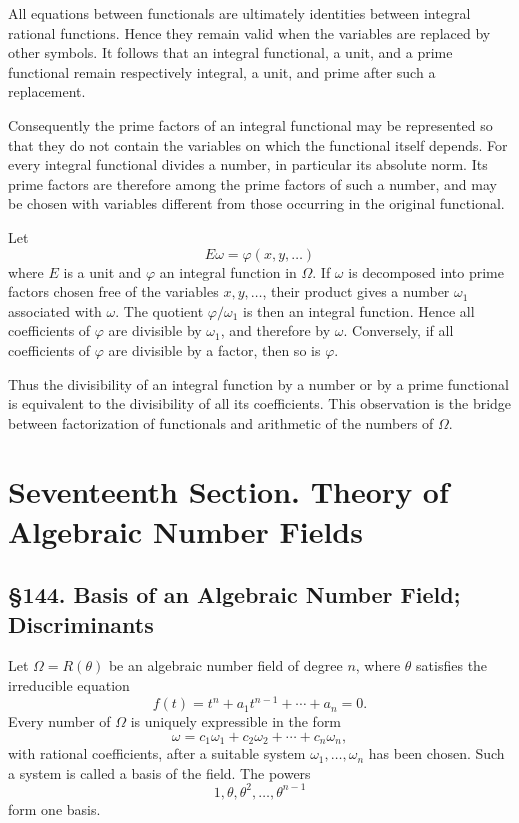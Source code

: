 \documentclass[11pt,a4paper]{book}
\newcommand{\webersection}[2]{\clearpage\section*{\S #1. #2}}
\newcommand{\booktitle}[1]{\clearpage\chapter*{#1}}
\begin{document}
All equations between functionals are ultimately identities between integral rational functions.  Hence they remain valid when the variables are replaced by other symbols.  It follows that an integral functional, a unit, and a prime functional remain respectively integral, a unit, and prime after such a replacement.

Consequently the prime factors of an integral functional may be represented so that they do not contain the variables on which the functional itself depends.  For every integral functional divides a number, in particular its absolute norm.  Its prime factors are therefore among the prime factors of such a number, and may be chosen with variables different from those occurring in the original functional.

Let
\begin{equation}
 E\omega=
\varphi(x,y,
\ldots) \tag{1}
\end{equation}
where \(E\) is a unit and \(\varphi\) an integral function in \(\Omega\).  If \(\omega\) is decomposed into prime factors chosen free of the variables \(x,y,
\ldots\), their product gives a number \(\omega_1\) associated with \(\omega\).  The quotient \(\varphi/
\omega_1\) is then an integral function.  Hence all coefficients of \(\varphi\) are divisible by \(\omega_1\), and therefore by \(\omega\).  Conversely, if all coefficients of \(\varphi\) are divisible by a factor, then so is \(\varphi\).

Thus the divisibility of an integral function by a number or by a prime functional is equivalent to the divisibility of all its coefficients.  This observation is the bridge between factorization of functionals and arithmetic of the numbers of \(\Omega\).

\booktitle{Seventeenth Section. Theory of Algebraic Number Fields}

\webersection{144}{Basis of an Algebraic Number Field; Discriminants}

Let \(\Omega=R(\theta)\) be an algebraic number field of degree \(n\), where \(\theta\) satisfies the irreducible equation
\begin{equation}
 f(t)=t^n+a_1t^{n-1}+\cdots+a_n=0. \tag{1}
\end{equation}
Every number of \(\Omega\) is uniquely expressible in the form
\begin{equation}
 \omega=c_1\omega_1+c_2\omega_2+
\cdots+c_n\omega_n, \tag{2}
\end{equation}
with rational coefficients, after a suitable system \(\omega_1,
\ldots,
\omega_n\) has been chosen.  Such a system is called a basis of the field.  The powers
\begin{equation}
 1,\theta,\theta^2,
\ldots,\theta^{n-1} \tag{3}
\end{equation}
form one basis.
\end{document}
